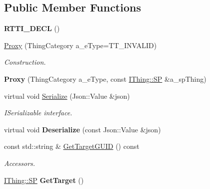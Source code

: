 \subsection*{Public Member Functions}
\begin{DoxyCompactItemize}
\item 
\mbox{\label{class_proxy_aa0804f7d47c16eb60c979ea6df61758e}} 
{\bfseries R\+T\+T\+I\+\_\+\+D\+E\+CL} ()
\item 
\mbox{\label{class_proxy_a69c4dd7c847504b7f65774e3dde67c1b}} 
\hyperlink{class_proxy_a69c4dd7c847504b7f65774e3dde67c1b}{Proxy} (Thing\+Category a\+\_\+e\+Type=T\+T\+\_\+\+I\+N\+V\+A\+L\+ID)
\begin{DoxyCompactList}\small\item\em Construction. \end{DoxyCompactList}\item 
\mbox{\label{class_proxy_ae458f80d1e8dfd9cc360c525df52f3ec}} 
{\bfseries Proxy} (Thing\+Category a\+\_\+e\+Type, const \hyperlink{class_i_thing_a6e95654aef6362c48b9a2fd44a1f970a}{I\+Thing\+::\+SP} \&a\+\_\+sp\+Thing)
\item 
\mbox{\label{class_proxy_a8149837d9a7a2efa5b268097b21516e5}} 
virtual void \hyperlink{class_proxy_a8149837d9a7a2efa5b268097b21516e5}{Serialize} (Json\+::\+Value \&json)
\begin{DoxyCompactList}\small\item\em I\+Serializable interface. \end{DoxyCompactList}\item 
\mbox{\label{class_proxy_a959a0ba1176819f0b60dc982e515dbf0}} 
virtual void {\bfseries Deserialize} (const Json\+::\+Value \&json)
\item 
\mbox{\label{class_proxy_af0017755511d78b4bbd8a1bfe804f26c}} 
const std\+::string \& \hyperlink{class_proxy_af0017755511d78b4bbd8a1bfe804f26c}{Get\+Target\+G\+U\+ID} () const
\begin{DoxyCompactList}\small\item\em Accessors. \end{DoxyCompactList}\item 
\mbox{\label{class_proxy_aae22d6e606a11c94f37f51eaddbc77f8}} 
\hyperlink{class_i_thing_a6e95654aef6362c48b9a2fd44a1f970a}{I\+Thing\+::\+SP} {\bfseries Get\+Target} ()
\end{DoxyCompactItemize}
